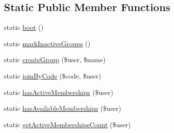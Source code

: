 \subsection*{Static Public Member Functions}
\begin{DoxyCompactItemize}
\item 
static \hyperlink{classDMA_1_1Friends_1_1Models_1_1UserGroup_a556c5f9443e270feb7824c30de13b85f}{boot} ()
\item 
static \hyperlink{classDMA_1_1Friends_1_1Models_1_1UserGroup_aab4ef6fdd0f8d9d18ca905250c7e00c5}{mark\+Inactive\+Groups} ()
\item 
static \hyperlink{classDMA_1_1Friends_1_1Models_1_1UserGroup_aad51304db18c13520b9753e2380089bb}{create\+Group} (\$user, \$name)
\item 
static \hyperlink{classDMA_1_1Friends_1_1Models_1_1UserGroup_a31058e5ae8a66da47fac81a70edd7d1a}{join\+By\+Code} (\$code, \$user)
\item 
static \hyperlink{classDMA_1_1Friends_1_1Models_1_1UserGroup_a98977f281ed3d9dc85220af0207c764d}{has\+Active\+Memberships} (\$user)
\item 
static \hyperlink{classDMA_1_1Friends_1_1Models_1_1UserGroup_ae4b0877257fa876bbe3226f8dcc1e0b4}{has\+Available\+Memberships} (\$user)
\item 
static \hyperlink{classDMA_1_1Friends_1_1Models_1_1UserGroup_a224d129818f1ab0831ddb054dff1f514}{get\+Active\+Memberships\+Count} (\$user)
\end{DoxyCompactItemize}
